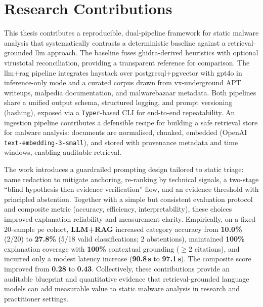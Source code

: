 \section{Research Contributions}
This thesis contributes a reproducible, dual-pipeline framework for static malware analysis that
systematically contrasts a deterministic baseline against a retrieval-grounded \gls{llm} approach.
The baseline fuses \gls{ghidra}-derived heuristics with optional \gls{virustotal} reconciliation,
providing a transparent reference for comparison. The \gls{llm}+\gls{rag} pipeline integrates
\gls{haystack} over \gls{postgresql}+\gls{pgvector} with \gls{gpt4o} in inference-only mode and a
curated corpus drawn from \gls{vx-underground} APT writeups, \gls{malpedia} documentation, and
\gls{malwarebazaar} metadata. Both pipelines share a unified output schema, structured logging, and
prompt versioning (hashing), exposed via a \texttt{Typer}-based CLI for end-to-end repeatability.
An ingestion pipeline contributes a defensible recipe for building a safe retrieval store for
malware analysis: documents are normalised, chunked, embedded (OpenAI
\texttt{text-embedding-3-small}), and stored with provenance metadata and time windows, enabling
auditable retrieval.

The work introduces a guardrailed prompting design tailored to static triage: name redaction to
mitigate anchoring, re-ranking by technical signals, a two-stage ``blind hypothesis then evidence
verification'' flow, and an evidence threshold with principled abstention. Together with a simple
but consistent evaluation protocol and composite metric (accuracy, efficiency, interpretability),
these choices improved explanation reliability and measurement clarity. Empirically, on a fixed
20-sample \gls{pe} cohort, \textbf{LLM+RAG} increased category accuracy from \textbf{10.0\%} (2/20)
to \textbf{27.8\%} (5/18 valid classifications; 2 abstentions), maintained \textbf{100\%}
explanation coverage with \textbf{100\%} contextual grounding (\(\geq\)2 citations), and incurred
only a modest latency increase (\textbf{90.8\,s} to \textbf{97.1\,s}). The composite score improved
from \textbf{0.28} to \textbf{0.43}. Collectively, these contributions provide an auditable
blueprint and quantitative evidence that retrieval-grounded language models can add measurable
value to static malware analysis in research and practitioner settings.


